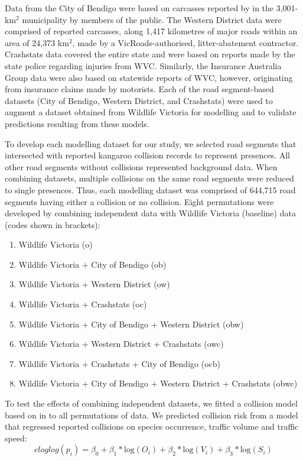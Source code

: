 Data from the City of Bendigo were based on carcasses reported by in the 3,001-km$^2$ municipality by members of the public. The Western District data were comprised of reported carcasses, along 1,417 kilometres of major roads within an area of 24,373 km$^2$, made by a VicRoads-authorised, litter-abatement contractor. Crashstats data covered the entire state and were based on reports made by the state police regarding injuries from WVC. Similarly, the Insurance Australia Group data were also based on statewide reports of WVC, however, originating from insurance claims made by motorists. Each of the road segment-based datasets (City of Bendigo, Western District, and Crashstats) were used to augment a dataset obtained from Wildlife Victoria for modelling and to validate predictions resulting from these models.

To develop each modelling dataset for our study, we selected road segments that intersected with reported kangaroo collision records to represent presences. All other road segments without collisions represented background data. When combining datasets, multiple collisions on the same road segments were reduced to single presences. Thus, each modelling dataset was comprised of 644,715 road segments having either a collision or no collision. Eight permutations were developed by combining independent data with Wildlife Victoria (baseline) data (codes shown in brackets):

\begin{enumerate}
	\item Wildlife Victoria (o)
	\item Wildlife Victoria + City of Bendigo (ob)
	\item Wildlife Victoria + Western District (ow)
	\item Wildlife Victoria + Crashstats (oc)
	\item Wildlife Victoria + City of Bendigo + Western District (obw)
	\item Wildlife Victoria + Western District + Crashstats (owc)
	\item Wildlife Victoria + Crashstats + City of Bendigo (ocb)
	\item Wildlife Victoria + City of Bendigo + Western District + Crashstats (obwc)
\end{enumerate}

To test the effects of combining independent datasets, we fitted a collision model based on  in  to all permutations of data.  We predicted collision risk from a model that regressed reported collisions on species occurrence, traffic volume and traffic speed:
\begin{equation} \label{eq:61}
cloglog(p_i) = \beta_0 + \beta_1*\text{log}(O_i) + \beta_2*\text{log}(V_i) + \beta_3*\text{log}(S_i)
\end{equation}


